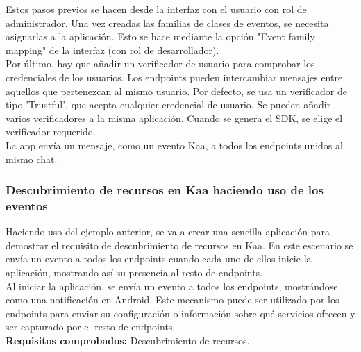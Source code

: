 \documentclass[12pt, twoside]{book}
\begin{document}
Estos pasos previos se hacen desde la interfaz con el usuario con rol de administrador. Una vez creadas las familias de clases de eventos, se necesita asignarlas a la aplicación. Esto se hace mediante la opción "Event family mapping" de la interfaz (con rol de desarrollador). \\
Por último, hay que añadir 	un verificador de usuario para comprobar los credenciales de los usuarios. Los endpoints pueden intercambiar mensajes entre aquellos que pertenezcan al mismo usuario. Por defecto, se usa un verificador de tipo 'Trustful', que acepta cualquier credencial de usuario. Se pueden añadir varios verificadores a la misma aplicación. Cuando se genera el SDK, se elige el verificador requerido. \\
La app envía un mensaje, como un evento Kaa, a todos los endpoints unidos al mismo chat.


\subsubsection*{Descubrimiento de recursos en Kaa haciendo uso de los eventos}
Haciendo uso del ejemplo anterior, se va a crear una sencilla aplicación para demostrar el requisito de descubrimiento de recursos en Kaa. En este escenario se envía un evento a todos los endpoints cuando cada uno de ellos inicie la aplicación, mostrando así su presencia al resto de endpoints.\\
Al iniciar la aplicación, se envía un evento a todos los endpoints, mostrándose como una notificación en Android. Este mecanismo puede ser utilizado por los endpoints para enviar su configuración o información sobre qué servicios ofrecen y ser capturado por el resto de endpoints.\\


\textbf{Requisitos comprobados: } Descubrimiento de recursos.
\end{document}

